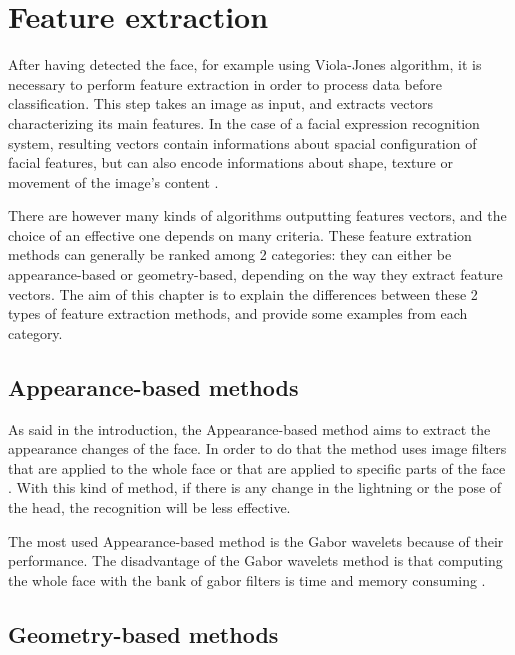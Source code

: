 \chapter{Feature extraction}
\label{chap:extraction}

\noindent After having detected the face, for example using Viola-Jones algorithm, it is necessary to perform feature extraction in order to process data before classification. 
This step takes an image as input, and extracts vectors characterizing its main features. In the case of a facial expression recognition system, resulting vectors contain informations about spacial configuration of facial features, but can also encode informations about shape, texture or movement of the image's content \cite{CHI03}.
\newline

\noindent There are however many kinds of algorithms outputting features vectors, and the choice of an effective one depends on many criteria. These feature extration methods can generally be ranked among 2 categories: they can either be appearance-based or geometry-based, depending on the way they extract feature vectors. The aim of this chapter is to explain the differences between these 2 types of feature extraction methods, and provide some examples from each category.
\newline

\section{Appearance-based methods}

\noindent As said in the introduction, the Appearance-based method aims to extract the appearance changes of the face. In order to do that the method uses image filters that are applied to the whole face or that are applied to specific parts of the face \cite{SHA09}. With this kind of method, if there is any change in the lightning or the pose of the head, the recognition will be less effective.
\newline

\noindent The most used Appearance-based method is the Gabor wavelets because of their performance. The disadvantage of the Gabor wavelets method is that computing the whole face with the bank of gabor filters is time and memory consuming \cite{SHA09}.
\newline

\section{Geometry-based methods}

